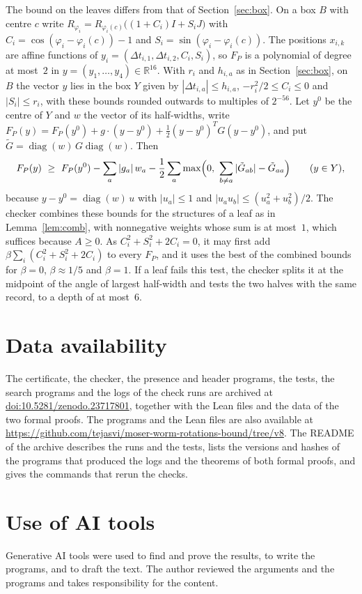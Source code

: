 \documentclass[11pt]{amsart}
\theoremstyle{definition}
\theoremstyle{remark}
\numberwithin{equation}{section}
\newcommand{\R}{\mathbb{R}}
\newcommand{\ZENODODOI}{10.5281/zenodo.23717801}   %
\newcommand{\REPOURL}{https://github.com/tejasvi/moser-worm-rotations-bound/tree/v8}   %
\newcommand{\COMMITREF}{}   %
\begin{document}
The bound on the leaves differs from that of Section~\ref{sec:box}. On a box $B$ with centre $c$ write $R_{\varphi_i}=R_{\varphi_i(c)}\bigl((1+C_i)I+S_iJ\bigr)$ with $C_i=\cos(\varphi_i-\varphi_i(c))-1$ and $S_i=\sin(\varphi_i-\varphi_i(c))$. The positions $x_{i,k}$ are affine functions of $y_i=(\Delta t_{i,1},\Delta t_{i,2},C_i,S_i)$, so $F_P$ is a polynomial of degree at most~$2$ in $y=(y_1,\dots,y_4)\in\R^{16}$. With $r_i$ and $h_{i,a}$ as in Section~\ref{sec:box}, on $B$ the vector $y$ lies in the box $Y$ given by $|\Delta t_{i,a}|\le h_{i,a}$, $-r_i^2/2\le C_i\le0$ and $|S_i|\le r_i$, with these bounds rounded outwards to multiples of $2^{-56}$. Let $y^0$ be the centre of $Y$ and $w$ the vector of its half-widths, write $F_P(y)=F_P(y^0)+g\cdot(y-y^0)+\frac12(y-y^0)^TG(y-y^0)$, and put $\tilde G=\operatorname{diag}(w)\,G\operatorname{diag}(w)$. Then
\[
F_P(y)\ \ge\ F_P(y^0)-\sum_a|g_a|\,w_a-\frac12\sum_a\max\Bigl(0,\ \sum_{b\ne a}|\tilde G_{ab}|-\tilde G_{aa}\Bigr)\qquad(y\in Y),
\]
because $y-y^0=\operatorname{diag}(w)\,u$ with $|u_a|\le1$ and $|u_au_b|\le(u_a^2+u_b^2)/2$. The checker combines these bounds for the structures of a leaf as in Lemma~\ref{lem:comb}, with nonnegative weights whose sum is at most~$1$, which suffices because $A\ge0$. As $C_i^2+S_i^2+2C_i=0$, it may first add $\beta\sum_i(C_i^2+S_i^2+2C_i)$ to every $F_P$, and it uses the best of the combined bounds for $\beta=0$, $\beta\approx1/5$ and $\beta=1$. If a leaf fails this test, the checker splits it at the midpoint of the angle of largest half-width and tests the two halves with the same record, to a depth of at most~$6$.

\section*{Data availability}
The certificate, the checker, the presence and header programs, the tests, the search programs and the logs of the check runs are archived at \href{https://doi.org/\ZENODODOI}{doi:\ZENODODOI}, together with the Lean files and the data of the two formal proofs. The programs and the Lean files are also available at \url{\REPOURL}\COMMITREF. The README of the archive describes the runs and the tests, lists the versions and hashes of the programs that produced the logs and the theorems of both formal proofs, and gives the commands that rerun the checks.

\section*{Use of AI tools}
Generative AI tools were used to find and prove the results, to write the programs, and to draft the text. The author reviewed the arguments and the programs and takes responsibility for the content.
\end{document}
